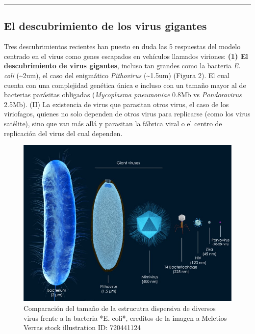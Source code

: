 \documentclass[
  12pt, krantz2,
  spanish,
]{krantz}
\begin{document}
\begin{center}\rule{0.5\linewidth}{0.5pt}\end{center}

\hypertarget{el-descubrimiento-de-los-virus-gigantes}{%
\subsection{El descubrimiento de los virus gigantes}\label{el-descubrimiento-de-los-virus-gigantes}}

Tres descubrimientos recientes han puesto en duda las 5 respuestas del modelo centrado en el virus como genes escapados en vehículos llamados viriones: \textbf{(1) El descubrimiento de virus gigantes}, incluso tan grandes como la bacteria \emph{E. coli} (\textasciitilde2um), el caso del enigmático \emph{Pithovirus} (\textasciitilde1.5um) (Figura 2). El cual cuenta con una complejidad genética única e incluso con un tamaño mayor al de bacterias parásitas obligadas (\emph{Mycoplasma pneumoniae} 0.8Mb vs \emph{Pandoravirus} 2.5Mb). (II) La existencia de virus que parasitan otros virus, el caso de los viriofagos, quienes no solo dependen de otros virus para replicarse (como los virus satélite), sino que van más allá y parasitan la fábrica viral o el centro de replicación del virus del cual dependen.

\begin{figure}
\includegraphics[width=0.8\linewidth]{figures/sizes} \caption{ Comparación del tamaño de la estrucutra dispersiva de diversos virus frente a la bacteria *E. coli*, creditos de la imagen a Meletios Verras stock illustration ID: 720441124}\label{fig:sizes}
\end{figure}
\end{document}

